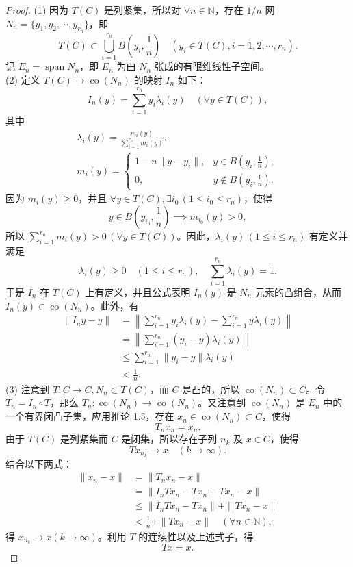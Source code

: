 \documentclass[lang=cn,newtx,10pt,scheme=chinese,thmcnt=chapter]{elegantbook}
\begin{document}
\begin{proof}
(1) 因为 \(T(C)\) 是列紧集，所以对 \(\forall n \in \mathbb{N}\)，存在 \(1/n\) 网 \(N_n = \{y_1, y_2, \cdots, y_{r_n}\}\)，即
\[
T(C) \subset \bigcup_{i=1}^{r_n} B\left(y_i, \frac{1}{n}\right) \quad\left(y_i \in T(C), i=1,2,\cdots,r_n\right).
\]
记 \(E_n = \operatorname{span} N_n\)，即 \(E_n\) 为由 \(N_n\) 张成的有限维线性子空间。\\
(2) 定义 \(T(C) \rightarrow \operatorname{co}(N_n)\) 的映射 \(I_n\) 如下：
\[
I_n(y) = \sum_{i=1}^{r_n} y_i \lambda_i(y) \quad (\forall y \in T(C)),
\]
其中
\[
\begin{gathered}
\lambda_i(y) = \frac{m_i(y)}{\sum_{i=1}^{r_n} m_i(y)}, \\
m_i(y) =
\begin{cases}
1 - n \|y - y_i\|, & y \in B\left(y_i, \frac{1}{n}\right), \\
0, & y \notin B\left(y_i, \frac{1}{n}\right).
\end{cases}
\end{gathered}
\]
因为 \(m_i(y) \geqslant 0\)，并且 \(\forall y \in T(C), \exists i_0 \, (1 \leqslant i_0 \leqslant r_n)\)，使得
\[
y \in B\left(y_{i_0}, \frac{1}{n}\right) \implies m_{i_0}(y) > 0,
\]
所以 \(\sum_{i=1}^{r_n} m_i(y) > 0 \, (\forall y \in T(C))\)。因此，\(\lambda_i(y) \, (1 \leqslant i \leqslant r_n)\) 有定义并满足
\[
\lambda_i(y) \geqslant 0 \quad (1 \leqslant i \leqslant r_n), \quad \sum_{i=1}^{r_n} \lambda_i(y) = 1.
\]
于是 \(I_n\) 在 \(T(C)\) 上有定义，并且公式表明 \(I_n(y)\) 是 \(N_n\) 元素的凸组合，从而 \(I_n(y) \in \operatorname{co}(N_n)\)。此外，有
\[
\begin{aligned}
\|I_n y - y\| &= \left\|\sum_{i=1}^{r_n} y_i \lambda_i(y) - \sum_{i=1}^{r_n} y \lambda_i(y)\right\| \\
&= \left\|\sum_{i=1}^{r_n} (y_i - y) \lambda_i(y)\right\| \\
&\leqslant \sum_{i=1}^{r_n} \|y_i - y\| \lambda_i(y) \\
&< \frac{1}{n}.
\end{aligned}
\]
(3) 注意到 \(T: C \rightarrow C, N_n \subset T(C)\)，而 \(C\) 是凸的，所以 \(\operatorname{co}(N_n) \subset C\)。令 \(T_n = I_n \circ T\)，那么 \(T_n: \operatorname{co}(N_n) \rightarrow \operatorname{co}(N_n)\)。又注意到 \(\operatorname{co}(N_n)\) 是 \(E_n\) 中的一个有界闭凸子集，应用推论 1.5，存在 \(x_n \in \operatorname{co}(N_n) \subset C\)，使得
\[
T_n x_n = x_n.
\]
由于 \(T(C)\) 是列紧集而 \(C\) 是闭集，所以存在子列 \(n_k\) 及 \(x \in C\)，使得
\[
T x_{n_k} \rightarrow x \quad (k \rightarrow \infty).
\]
结合以下两式：
\[
\begin{aligned}
\|x_n - x\| &= \|T_n x_n - x\| \\
&= \|I_n T x_n - T x_n + T x_n - x\| \\
&\leqslant \|I_n T x_n - T x_n\| + \|T x_n - x\| \\
&< \frac{1}{n} + \|T x_n - x\| \quad (\forall n \in \mathbb{N}),
\end{aligned}
\]
得 \(x_{n_k} \rightarrow x (k \rightarrow \infty)\)。利用 \(T\) 的连续性以及上述式子，得
\[
T x = x.
\]
\end{proof}
\end{document}
